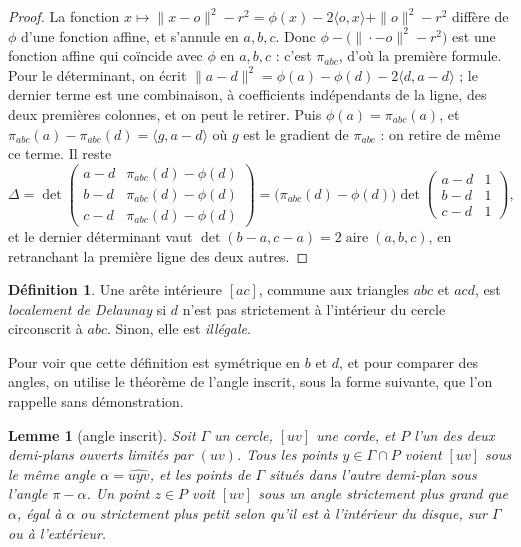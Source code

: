 \documentclass[11pt,a4paper]{article}
\theoremstyle{plain}
\newtheorem{lemme}[theoreme]{Lemme}
\theoremstyle{definition}
\newtheorem{definition}[theoreme]{Définition}
\theoremstyle{remark}
\DeclareMathOperator{\aire}{aire}
\begin{document}
\begin{proof}
La fonction $x\mapsto\|x-o\|^2-r^2=\phi(x)-2\langle o,x\rangle+\|o\|^2-r^2$ diffère de $\phi$ d'une fonction affine, et s'annule en $a,b,c$. Donc $\phi-\big(\|\cdot-o\|^2-r^2\big)$ est une fonction affine qui coïncide avec $\phi$ en $a,b,c$ : c'est $\pi_{abc}$, d'où la première formule. Pour le déterminant, on écrit $\|a-d\|^2=\phi(a)-\phi(d)-2\langle d,a-d\rangle$ ; le dernier terme est une combinaison, à coefficients indépendants de la ligne, des deux premières colonnes, et on peut le retirer. Puis $\phi(a)=\pi_{abc}(a)$, et $\pi_{abc}(a)-\pi_{abc}(d)=\langle g,a-d\rangle$ où $g$ est le gradient de $\pi_{abc}$ : on retire de même ce terme. Il reste
\[
  \Delta=\det\begin{pmatrix}a-d&\pi_{abc}(d)-\phi(d)\\ b-d&\pi_{abc}(d)-\phi(d)\\ c-d&\pi_{abc}(d)-\phi(d)\end{pmatrix}
  =\big(\pi_{abc}(d)-\phi(d)\big)\det\begin{pmatrix}a-d&1\\ b-d&1\\ c-d&1\end{pmatrix},
\]
et le dernier déterminant vaut $\det(b-a,c-a)=2\aire(a,b,c)$, en retranchant la première ligne des deux autres.
\end{proof}

\begin{definition}\label{def:legale}
Une arête intérieure $[ac]$, commune aux triangles $abc$ et $acd$, est \emph{localement de Delaunay} si $d$ n'est pas strictement à l'intérieur du cercle circonscrit à $abc$. Sinon, elle est \emph{illégale}.
\end{definition}

Pour voir que cette définition est symétrique en $b$ et $d$, et pour comparer des angles, on utilise le théorème de l'angle inscrit, sous la forme suivante, que l'on rappelle sans démonstration.

\begin{lemme}[angle inscrit]\label{lem:inscrit}
Soit $\Gamma$ un cercle, $[uv]$ une corde, et $P$ l'un des deux demi-plans ouverts limités par $(uv)$. Tous les points $y\in\Gamma\cap P$ voient $[uv]$ sous le même angle $\alpha=\widehat{uyv}$, et les points de $\Gamma$ situés dans l'autre demi-plan sous l'angle $\pi-\alpha$. Un point $z\in P$ voit $[uv]$ sous un angle strictement plus grand que $\alpha$, égal à $\alpha$ ou strictement plus petit selon qu'il est à l'intérieur du disque, sur $\Gamma$ ou à l'extérieur.
\end{lemme}
\end{document}
